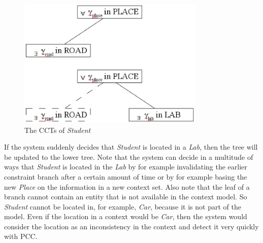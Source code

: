 \documentclass[journal]{vgtc}                %
\begin{document}
\begin{figure}[htb]
  \centering
  \includegraphics[width=3.5in]{smallCCT1.eps}
  \caption{The CCTs of \textit{Student}}
  \label{fig:cct1}
\end{figure}

If the system suddenly decides that \textit{Student} is located in a \textit{Lab}, then the tree will be updated to the lower tree. Note that the system can decide in a multitude of ways that \textit{Student} is located in the \textit{Lab} by for example invalidating the earlier constraint branch after a certain amount of time or by for example basing the new \textit{Place} on the information in a new context set. Also note that the leaf of a branch cannot contain an entity that is not available in the context model. So \textit{Student} cannot be located in, for example, \textit{Car}, because it is not part of the model. Even if the location in a context would be \textit{Car}, then the system would consider the location as an inconsistency in the context and detect it very quickly with PCC.
\end{document}
